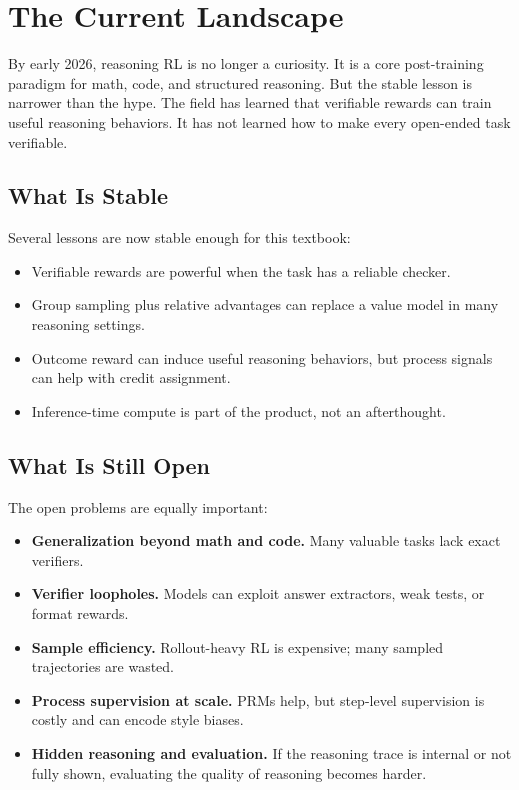 \section{The Current Landscape}
\label{sec:reasoning-landscape}

By early 2026, reasoning RL is no longer a curiosity. It is a core post-training paradigm for math, code, and structured reasoning. But the stable lesson is narrower than the hype. The field has learned that verifiable rewards can train useful reasoning behaviors. It has not learned how to make every open-ended task verifiable.

\subsection{What Is Stable}

Several lessons are now stable enough for this textbook:

\begin{itemize}[nosep]
  \item Verifiable rewards are powerful when the task has a reliable checker.
  \item Group sampling plus relative advantages can replace a value model in many reasoning settings.
  \item Outcome reward can induce useful reasoning behaviors, but process signals can help with credit assignment.
  \item Inference-time compute is part of the product, not an afterthought.
\end{itemize}

\subsection{What Is Still Open}

The open problems are equally important:

\begin{itemize}[nosep]
  \item \textbf{Generalization beyond math and code.} Many valuable tasks lack exact verifiers.
  \item \textbf{Verifier loopholes.} Models can exploit answer extractors, weak tests, or format rewards.
  \item \textbf{Sample efficiency.} Rollout-heavy RL is expensive; many sampled trajectories are wasted.
  \item \textbf{Process supervision at scale.} PRMs help, but step-level supervision is costly and can encode style biases.
  \item \textbf{Hidden reasoning and evaluation.} If the reasoning trace is internal or not fully shown, evaluating the quality of reasoning becomes harder.
\end{itemize}

